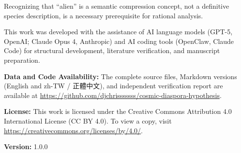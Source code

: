 \documentclass[aps,prd,twocolumn,superscriptaddress,nofootinbib]{revtex4-2}
\begin{document}
Recognizing that ``alien'' is a semantic compression concept, not a definitive species description, is a necessary prerequisite for rational analysis.


\begin{acknowledgments}
This work was developed with the assistance of AI language models (GPT-5, OpenAI; Claude Opus 4, Anthropic) and AI coding tools (OpenClaw, Claude Code) for structural development, literature verification, and manuscript preparation.

\textbf{Data and Code Availability:} The complete source files, Markdown versions (English and zh-TW / 正體中文), and independent verification report are available at \url{https://github.com/djchrisssssss/cosmic-diaspora-hypothesis}.

\textbf{License:} This work is licensed under the Creative Commons Attribution 4.0 International License (CC BY 4.0). To view a copy, visit \url{https://creativecommons.org/licenses/by/4.0/}.

\textbf{Version:} 1.0.0
\end{acknowledgments}


\end{document}
